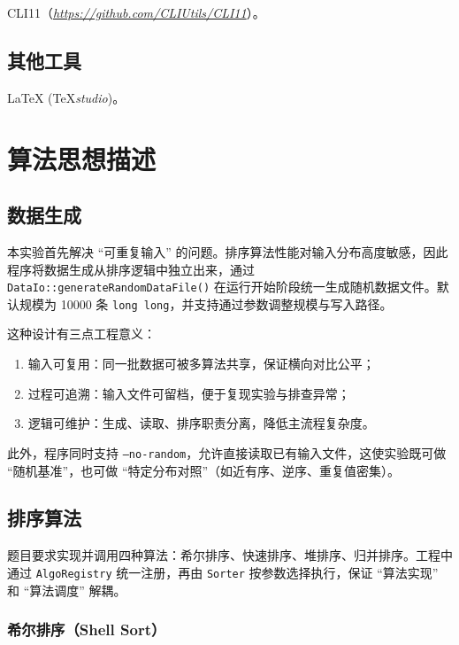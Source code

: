 \documentclass[12pt, a4paper]{ctexart}
\begin{document}
CLI11（\href{https://github.com/CLIUtils/CLI11}{\textit{https://github.com/CLIUtils/CLI11}}）。

\subsection{其他工具}

\LaTeX{} (\TeX\textit{studio})。

\section{算法思想描述}

\subsection{数据生成}

本实验首先解决 ``可重复输入'' 的问题。排序算法性能对输入分布高度敏感，因此程序将数据生成从排序逻辑中独立出来，通过 \texttt{DataIo::generateRandomDataFile()} 在运行开始阶段统一生成随机数据文件。默认规模为 10000 条 \texttt{long long}，并支持通过参数调整规模与写入路径。

这种设计有三点工程意义：

\begin{enumerate}
    \item 输入可复用：同一批数据可被多算法共享，保证横向对比公平；
    \item 过程可追溯：输入文件可留档，便于复现实验与排查异常；
    \item 逻辑可维护：生成、读取、排序职责分离，降低主流程复杂度。
\end{enumerate}

此外，程序同时支持 \texttt{--no-random}，允许直接读取已有输入文件，这使实验既可做 ``随机基准''，也可做 ``特定分布对照''（如近有序、逆序、重复值密集）。

\subsection{排序算法}

题目要求实现并调用四种算法：希尔排序、快速排序、堆排序、归并排序。工程中通过 \texttt{AlgoRegistry} 统一注册，再由 \texttt{Sorter} 按参数选择执行，保证 ``算法实现'' 和 ``算法调度'' 解耦。

\subsubsection{希尔排序（Shell Sort）}
\end{document}
